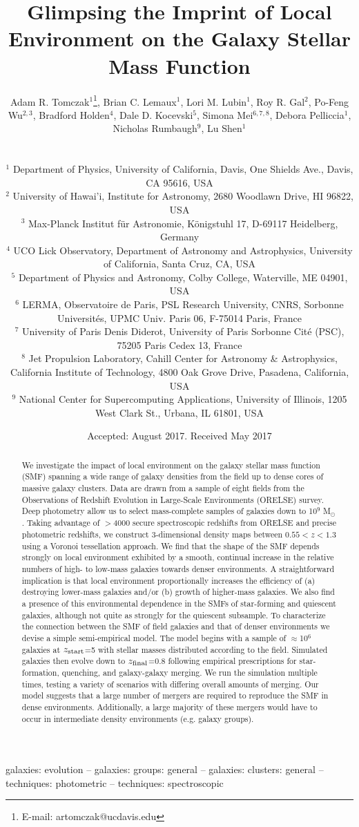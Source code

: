 \documentclass[a4paper,fleqn,usenatbib]{mnras}
\title[Imprint of Local Environment on the Galaxy SMF]{Glimpsing the Imprint of Local Environment on the Galaxy Stellar Mass Function}
\author[A. R. Tomczak et al.]
{\parbox{\textwidth}{Adam R. Tomczak$^{1}$\thanks{E-mail: artomczak@ucdavis.edu},
Brian C. Lemaux$^{1}$,
Lori M. Lubin$^{1}$,
Roy R. Gal$^{2}$,
Po-Feng Wu$^{2,3}$,
Bradford Holden$^{4}$,
Dale D. Kocevski$^{5}$,
Simona Mei$^{6,7,8}$,
Debora Pelliccia$^{1}$,
Nicholas Rumbaugh$^{9}$,
Lu Shen$^{1}$
}\\\\
$^1$ Department of Physics, University of California, Davis, One Shields Ave., Davis, CA 95616, USA\\
$^2$ University of Hawai'i, Institute for Astronomy, 2680 Woodlawn Drive, HI 96822, USA\\
$^3$ Max-Planck Institut f\"{u}r Astronomie, K\"{o}nigstuhl 17, D-69117 Heidelberg, Germany\\
$^4$ UCO Lick Observatory, Department of Astronomy and Astrophysics, University of California, Santa Cruz, CA, USA\\
$^5$ Department of Physics and Astronomy, Colby College, Waterville, ME 04901, USA\\
$^6$ LERMA, Observatoire de Paris, PSL Research University, CNRS, Sorbonne Universit\'es, UPMC Univ. Paris 06, F-75014 Paris, France\\
$^7$ University of Paris Denis Diderot, University of Paris Sorbonne Cit\'e (PSC), 75205 Paris Cedex 13, France\\
$^8$ Jet Propulsion Laboratory, Cahill Center for Astronomy \& Astrophysics, California Institute of Technology, 4800 Oak Grove Drive, Pasadena, California, USA\\
$^9$ National Center for Supercomputing Applications, University of Illinois, 1205 West Clark St., Urbana, IL 61801, USA\\
}
\date{Accepted: August 2017. Received May 2017}
\begin{document}
\label{firstpage}
\pagerange{\pageref{firstpage}--\pageref{lastpage}}
\maketitle

\begin{abstract}
We investigate the impact of local environment on the galaxy stellar mass function (SMF) spanning a wide range of galaxy densities from the field up to dense cores of massive galaxy clusters.
Data are drawn from a sample of eight fields from the Observations of Redshift Evolution in Large-Scale Environments (ORELSE) survey.
Deep photometry allow us to select mass-complete samples of galaxies down to 10$^9$ M$_{\odot}$. 
Taking advantage of $>$4000 secure spectroscopic redshifts from ORELSE and precise photometric redshifts, we construct 3-dimensional density maps between $0.55<z<1.3$ using a Voronoi tessellation approach.
We find that the shape of the SMF depends strongly on local environment exhibited by a smooth, continual increase in the relative numbers of high- to low-mass galaxies towards denser environments.
A straightforward implication is that local environment proportionally increases the efficiency of (a) destroying lower-mass galaxies and/or (b) growth of higher-mass galaxies.
We also find a presence of this environmental dependence in the SMFs of star-forming and quiescent galaxies, although not quite as strongly for the quiescent subsample.
To characterize the connection between the SMF of field galaxies and that of denser environments we devise a simple semi-empirical model.
The model begins with a sample of $\approx$10$^6$ galaxies at $z_{\rm{start}}$=5 with stellar masses distributed according to the field.
Simulated galaxies then evolve down to $z_{\rm{final}}$=0.8 following empirical prescriptions for star-formation, quenching, and galaxy-galaxy merging.
We run the simulation multiple times, testing a variety of scenarios with differing overall amounts of merging.
Our model suggests that a large number of mergers are required to reproduce the SMF in dense environments.
Additionally, a large majority of these mergers would have to occur in intermediate density environments (e.g. galaxy groups).
\end{abstract}

\begin{keywords}
galaxies: evolution -- galaxies: groups: general -- galaxies: clusters: general -- techniques: photometric -- techniques: spectroscopic
\end{keywords}
\end{document}
